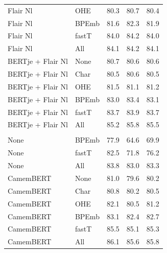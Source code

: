 \documentclass[12pt,a4paper,]{book}
\begin{document}
\begin{longtable}[t]{llrrr}
\hspace{1em}Flair Nl & OHE & 80.3 & 80.7 & 80.4\\
\hspace{1em}Flair Nl & BPEmb & 81.6 & 82.3 & 81.9\\
\hspace{1em}Flair Nl & fastT & 84.0 & 84.2 & 84.0\\
\hspace{1em}Flair Nl & All & 84.1 & 84.2 & 84.1\\
\hspace{1em}BERTje + Flair Nl & None & 80.7 & 80.6 & 80.6\\
\hspace{1em}BERTje + Flair Nl & Char & 80.5 & 80.6 & 80.5\\
\hspace{1em}BERTje + Flair Nl & OHE & 81.5 & 81.1 & 81.2\\
\hspace{1em}BERTje + Flair Nl & BPEmb & 83.0 & 83.4 & 83.1\\
\hspace{1em}BERTje + Flair Nl & fastT & 83.7 & 83.9 & 83.7\\
\hspace{1em}BERTje + Flair Nl & All & 85.2 & 85.8 & 85.5\\
\addlinespace[0.3em]
\multicolumn{5}{l}{\textbf{French embeddings}}\\
\hspace{1em}None & BPEmb & 77.9 & 64.6 & 69.9\\
\hspace{1em}None & fastT & 82.5 & 71.8 & 76.2\\
\hspace{1em}None & All & 83.8 & 83.0 & 83.3\\
\hspace{1em}CamemBERT & None & 81.0 & 79.6 & 80.2\\
\hspace{1em}CamemBERT & Char & 80.8 & 80.2 & 80.5\\
\hspace{1em}CamemBERT & OHE & 82.1 & 80.5 & 81.2\\
\hspace{1em}CamemBERT & BPEmb & 83.1 & 82.4 & 82.7\\
\hspace{1em}CamemBERT & fastT & 85.5 & 85.1 & 85.3\\
\hspace{1em}CamemBERT & All & 86.1 & 85.6 & 85.8\\

\end{longtable}
\end{document}
